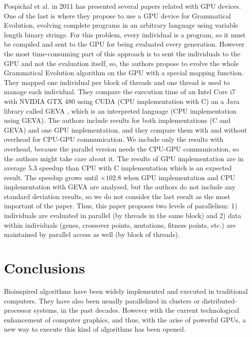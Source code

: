 \documentclass{comjnl}
\begin{document}
Pospichal et al. in 2011 has presented several papers related with GPU devices. One of the last is \cite{DBLP:conf/gecco/PospichalMOSJ11} where they propose to use a GPU device for Grammatical Evolution, evolving complete programs in an arbitrary language using variable length binary strings. For this problem, every individual is a program, so it must be compiled and sent to the GPU for being evaluated every generation. However the most time-consuming part of this approach is to sent the individuals to the GPU and not the evaluation itself, so, the authors propose to evolve the whole Grammatical Evolution algorithm on the GPU with a special mapping function. They mapped one individual per block of threads and one thread is used to manage each individual. They compare the execution time of an Intel Core i7 with NVIDIA GTX 480 using CUDA (CPU implementation with C) an a Java library called GEVA \cite{O'Neill:2008:GGE:1527063.1527066}, which is an interpreted language (CPU implementation using GEVA).  The authors include results for both implementations (C and GEVA) and one GPU implementation, and they compare them with and without overhead for CPU-GPU communication. We include only the results with overhead, because the parallel version needs the CPU-GPU communication, so the authors might take care about it. The results of GPU implementation are in average 5.3 speedup than CPU with C implementation which is an expected result. The speedup grows until $\times102.8$ when GPU implementation and CPU implementation with GEVA are analysed, but the authors do not include any standard deviation results, so we do not consider the last result as the most important of the paper. Thus, this paper proposes two levels of parallelism: 1) individuals are evaluated in parallel (by threads in the same block) and 2) data within individuals (genes, crossover points, mutations, fitness points, etc.) are maintained by parallel access as well (by block of threads).


\section{Conclusions}
\label{sec:conclusions}

Bioinspired algorithms have been widely implemented and executed in traditional computers. They have also been usually parallelized in clusters or distributed-processor systems, in the past decades. However with the current technological enhancement of computer graphics, and thus, with the arise of powerful GPUs, a new way to execute this kind of algorithms has been opened.
\end{document}
